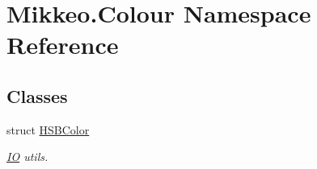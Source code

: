 \hypertarget{namespace_mikkeo_1_1_colour}{}\section{Mikkeo.\+Colour Namespace Reference}
\label{namespace_mikkeo_1_1_colour}
\subsection*{Classes}
\begin{DoxyCompactItemize}
\item 
struct \hyperlink{struct_mikkeo_1_1_colour_1_1_h_s_b_color}{H\+S\+B\+Color}
\begin{DoxyCompactList}\small\item\em \hyperlink{namespace_mikkeo_1_1_i_o}{IO} utils. \end{DoxyCompactList}\end{DoxyCompactItemize}
